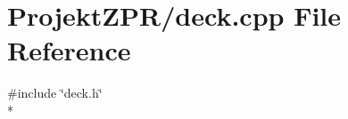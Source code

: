 \section{Projekt\-Z\-P\-R/deck.cpp File Reference}
\label{deck_8cpp}
{\ttfamily \#include \char`\"{}deck.\-h\char`\"{}}\\*
